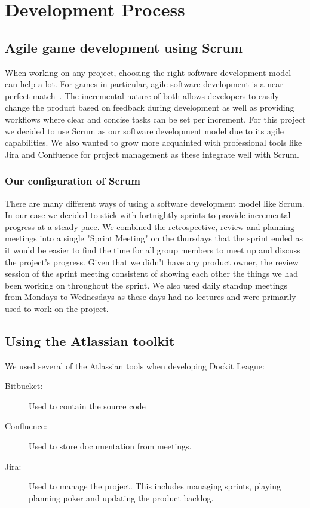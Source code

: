 \chapter{Development Process}
\label{chap:process}
\section{Agile game development using Scrum}
When working on any project, choosing the right software development model can help a lot. For games in particular, agile software development is a near perfect match~\cite{keith2010agile}. The incremental nature of both allows developers to easily change the product based on feedback during development as well as providing workflows where clear and concise tasks can be set per increment. For this project we decided to use Scrum as our software development model due to its agile capabilities. We also wanted to grow more acquainted with professional tools like Jira and Confluence for project management as these integrate well with Scrum.   

\subsection{Our configuration of Scrum}
There are many different ways of using a software development model like Scrum. In our case we decided to stick with fortnightly sprints to provide incremental progress at a steady pace. We combined the retrospective, review and planning meetings into a single "Sprint Meeting" on the thursdays that the sprint ended as it would be easier to find the time for all group members to meet up and discuss the project's progress. 
Given that we didn't have any product owner, the review session of the sprint meeting consistent of showing each other the things we had been working on throughout the sprint. We also used daily standup meetings from Mondays to Wednesdays as these days had no lectures and were primarily used to work on the project. 

\section{Using the Atlassian toolkit}
We used several of the Atlassian tools when developing Dockit League: 
\begin{description}
    \item[Bitbucket: ] Used to contain the source code
    \item[Confluence: ] Used to store documentation from meetings.
    \item[Jira: ] Used to manage the project. This includes managing sprints, playing planning poker and updating the product backlog. 
\end{description}

